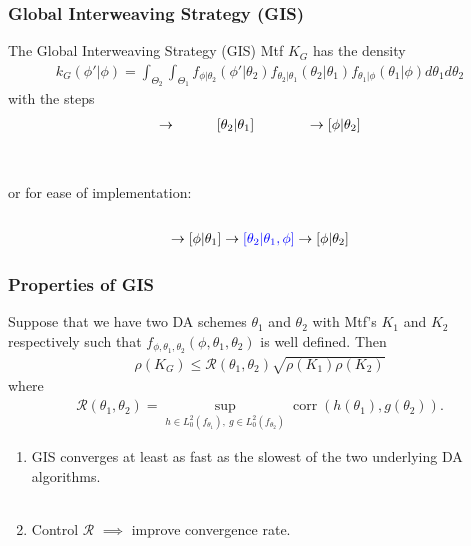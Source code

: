 \documentclass[xcolor=dvipsnames]{beamer}
\DeclareMathOperator{\corr}{corr}
\begin{document}
\begin{frame}
\frametitle{Global Interweaving Strategy (GIS)}

The Global Interweaving Strategy (GIS) Mtf $K_G$ has the density
\begin{align*}
k_G(\phi'|\phi) = \int_{\Theta_2}\int_{\Theta_1}f_{\phi|\theta_2}(\phi'|\theta_2)f_{\theta_2|\theta_1}(\theta_2|\theta_1)f_{\theta_1|\phi}(\theta_1|\phi)d\theta_1d\theta_2
\end{align*}
with the steps
\begin{align*}
[\theta_1|\phi] \to \hspace{1cm} [\theta_2|\theta_1] \hspace{1.3cm} \to [\phi|\theta_2]
\end{align*}\\~\\
\pause or for ease of implementation:\\~
\begin{align*}
[\theta_1|\phi] \to [\phi|\theta_1] \to {\color{blue}[\theta_2|\theta_1,\phi]} \to [\phi|\theta_2]
\end{align*}
\end{frame}

\begin{frame}
\frametitle{Properties of GIS}
\begin{theorem}
Suppose that we have two DA schemes $\theta_1$ and $\theta_2$ with Mtf's $K_1$ and $K_2$ respectively such that $f_{\phi,\theta_1,\theta_2}(\phi,\theta_1,\theta_2)$ is well defined. Then
\begin{align*}
\rho(K_G)\leq \mathcal{R}(\theta_1,\theta_2)\sqrt{\rho(K_1)\rho(K_2)}
\end{align*}
where 
\begin{align*}
\mathcal{R}(\theta_1,\theta_2) = \sup_{h\in L_0^2(f_{\theta_1}),\ g\in L_0^2(f_{\theta_2})} \corr(h(\theta_1),g(\theta_2)).
\end{align*}
\end{theorem}
\pause
\begin{enumerate}
\item GIS converges at least as fast as the slowest of the two underlying DA algorithms.\\~
\item Control $\mathcal{R}$ $\implies$ improve convergence rate.
\end{enumerate}
\end{frame}
\end{document}
